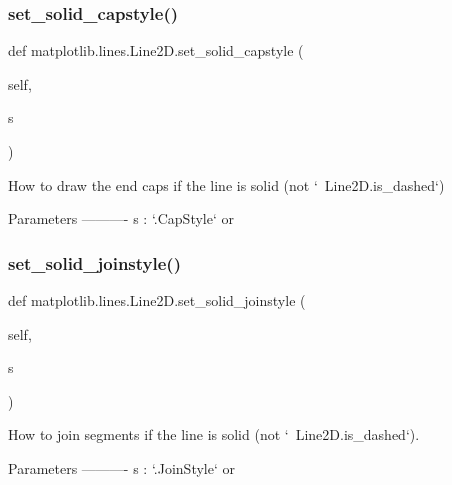 \subsubsection{\texorpdfstring{set\+\_\+solid\+\_\+capstyle()}{set\_solid\_capstyle()}}
{\footnotesize\ttfamily def matplotlib.\+lines.\+Line2\+D.\+set\+\_\+solid\+\_\+capstyle (\begin{DoxyParamCaption}\item[{}]{self,  }\item[{}]{s }\end{DoxyParamCaption})}

\begin{DoxyVerb}How to draw the end caps if the line is solid (not `~Line2D.is_dashed`)

Parameters
----------
s : `.CapStyle` or %
\end{DoxyVerb}
 \mbox{\label{classmatplotlib_1_1lines_1_1Line2D_acce6c98ed3119bafbf3feb3e27020f49}} 
\subsubsection{\texorpdfstring{set\+\_\+solid\+\_\+joinstyle()}{set\_solid\_joinstyle()}}
{\footnotesize\ttfamily def matplotlib.\+lines.\+Line2\+D.\+set\+\_\+solid\+\_\+joinstyle (\begin{DoxyParamCaption}\item[{}]{self,  }\item[{}]{s }\end{DoxyParamCaption})}

\begin{DoxyVerb}How to join segments if the line is solid (not `~Line2D.is_dashed`).

Parameters
----------
s : `.JoinStyle` or %
\end{DoxyVerb}
 \mbox{\label{classmatplotlib_1_1lines_1_1Line2D_a30010a533d5d6a2650ac6e039409fb83}} 
